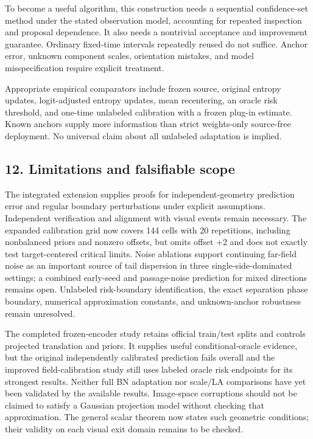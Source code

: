 To become a useful algorithm, this construction needs a sequential
confidence-set method under the stated observation model, accounting for
repeated inspection and proposal dependence. It also needs a nontrivial
acceptance and improvement guarantee. Ordinary fixed-time intervals
repeatedly reused do not suffice. Anchor error, unknown component
scales, orientation mistakes, and model misspecification require
explicit treatment.

Appropriate empirical comparators include frozen source, original
entropy updates, logit-adjusted entropy updates, mean recentering, an
oracle risk threshold, and one-time unlabeled calibration with a frozen
plug-in estimate. Known anchors supply more information than strict
weights-only source-free deployment. No universal claim about all
unlabeled adaptation is implied.

\subsection{12. Limitations and falsifiable
scope}\label{draft-limitations-and-falsifiable-scope}

The integrated extension supplies proofs for independent-geometry
prediction error and regular boundary perturbations under explicit
assumptions. Independent verification and alignment with visual events
remain necessary. The expanded calibration grid now covers 144 cells
with 20 repetitions, including nonbalanced priors and nonzero offsets,
but omits offset +2 and does not exactly test target-centered critical
limits. Noise ablations support continuing far-field noise as an
important source of tail dispersion in three single-side-dominated
settings; a combined early-seed and passage-noise prediction for mixed
directions remains open. Unlabeled risk-boundary identification, the
exact separation phase boundary, numerical approximation constants, and
unknown-anchor robustness remain unresolved.

The completed frozen-encoder study retains official train/test splits
and controls projected translation and priors. It supplies useful
conditional-oracle evidence, but the original independently calibrated
prediction fails overall and the improved field-calibration study still
uses labeled oracle risk endpoints for its strongest results. Neither
full BN adaptation nor scale/LA comparisons have yet been validated by
the available results. Image-space corruptions should not be claimed to
satisfy a Gaussian projection model without checking that approximation.
The general scalar theorem now states such geometric conditions; their
validity on each visual exit domain remains to be checked.

